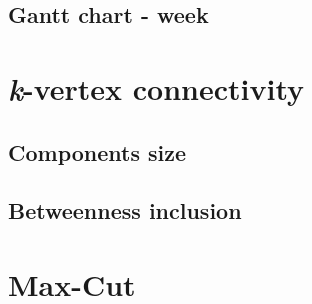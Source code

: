 	\subsection{Gantt chart - week}
	\section{\textit{k}-vertex connectivity}
	\subsection{Components size}
	\subsection{Betweenness inclusion}
	\section{Max-Cut}
